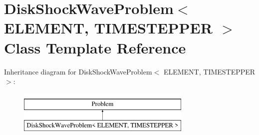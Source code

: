 \hypertarget{classDiskShockWaveProblem}{}\section{Disk\+Shock\+Wave\+Problem$<$ E\+L\+E\+M\+E\+NT, T\+I\+M\+E\+S\+T\+E\+P\+P\+ER $>$ Class Template Reference}
\label{classDiskShockWaveProblem}
Inheritance diagram for Disk\+Shock\+Wave\+Problem$<$ E\+L\+E\+M\+E\+NT, T\+I\+M\+E\+S\+T\+E\+P\+P\+ER $>$\+:\begin{figure}[H]
\begin{center}
\leavevmode
\includegraphics[height=2.000000cm]{classDiskShockWaveProblem}
\end{center}
\end{figure}
